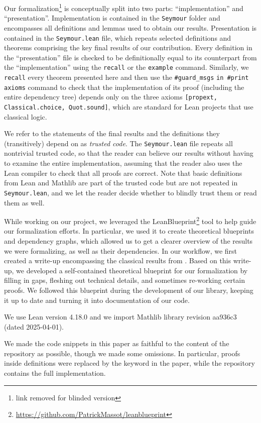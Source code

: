 Our formalization\footnote{link removed for blinded version} is conceptually split into two parts: ``implementation'' and ``presentation''. Implementation is contained in the \texttt{Seymour} folder and encompasses all definitions and lemmas used to obtain our results. Presentation is contained in the \texttt{Seymour.lean} file, which repeats selected definitions and theorems comprising the key final results of our contribution. Every definition in the ``presentation'' file is checked to be definitionally equal to its counterpart from the ``implementation'' using the \texttt{recall} or the \texttt{example} command. Similarly, we \texttt{recall} every theorem presented here and then use the \texttt{\#guard\_msgs} \texttt{in \#print} \texttt{axioms} \hbox{command} to check that the implementation of its proof (including the entire dependency tree) depends only on the three axioms \texttt{[propext, Classical.choice, Quot.sound]}, which are standard for Lean projects that use classical logic. %

We refer to the statements of the final results and the definitions they (transitively) depend on as \emph{trusted code}. The \texttt{Seymour.lean} file repeats all nontrivial trusted code, so that the reader can believe \cite{Pollack1997} our results without having to examine the entire implementation, assuming that the reader also uses the Lean compiler to check that all proofs are correct. Note that basic definitions from Lean and Mathlib are part of the trusted code but are not repeated in \texttt{Seymour.lean}, and we let the reader decide whether to blindly trust them or read them as well.

While working on our project, we leveraged the LeanBlueprint\footnote{\url{https://github.com/PatrickMassot/leanblueprint}} tool to help guide our formalization efforts. In particular, we used it to create theoretical blueprints and dependency graphs, which allowed us to get a clearer overview of the results we were formalizing, as well as their dependencies. In our workflow, we first created a write-up encompassing the classical results from \cite{Truemper2016}. Based on this write-up, we developed a self-contained theoretical blueprint for our formalization by filling in gaps, fleshing out technical details, and sometimes re-working certain proofs. We followed this blueprint during the development of our library, keeping it up to date and turning it into documentation of our code.

We use Lean version 4.18.0 and we import Mathlib library revision aa936c3 (dated 2025-04-01).

We made the code snippets in this paper as faithful to the content of the repository as possible, though we made some omissions. In particular, proofs inside definitions were replaced by the  keyword in the paper, while the repository contains the full implementation.
